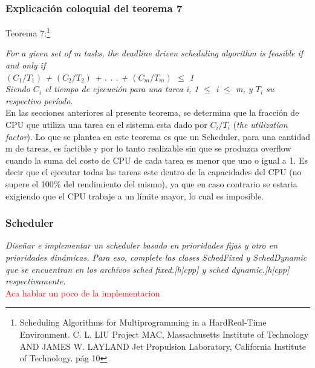 \documentclass[a4paper]{article}
\begin{document}
 \newpage
\subsubsection{Explicaci\'on coloquial del teorema 7}

Teorema 7:\footnote{Scheduling Algorithms for Multiprogramming in a HardReal-Time Environment.
C. L. LIU Project MAC, Massachusetts Institute of Technology AND JAMES W. LAYLAND Jet Propulsion Laboratory, California Institute of Technology. pág 10}

\textit {For a given set of m tasks, the deadline driven scheduling algorithm
is feasible if and only if }\\
 
 \textit {$(C_1/T_1)$ + $(C_2/T_2)$ + . . . + $(C_m/T_m)$ $\leq$ 1 } \\

\textit{Siendo $C_i$ el tiempo de ejecuci\'on para una tarea i, 1 $\leq$ i $\leq$ m, y $T_i$ su respectivo per\'iodo.}\\

En las secciones anteriores al presente teorema, se determina que la fracción de CPU que utiliza una tarea en el sistema esta dado por $C_i/T_i$ (\textit{the utilization factor}). Lo que se plantea en este teorema es que un Scheduler, para una cantidad m de tareas, es factible y por lo tanto realizable sin que se produzca overflow cuando la suma del costo de CPU de cada tarea es menor que uno o igual a 1. Es decir que el ejecutar todas las tareas este dentro de la capacidades del CPU (no supere el 100\% del rendimiento del mismo), ya que en caso contrario se estaria exigiendo que el CPU trabaje a un l\'imite mayor, lo cual es imposible. \\









\subsubsection{Scheduler}
\textit{Dise\~nar e implementar un scheduler basado en prioridades fijas y otro en prioridades din\'amicas. Para eso, complete las clases SchedFixed y SchedDynamic que se encuentran en los archivos sched fixed.[h|cpp] y sched dynamic.[h|cpp] respectivamente.}\\

\textcolor{red}{Aca hablar un poco de la implementacion}
\end{document}
